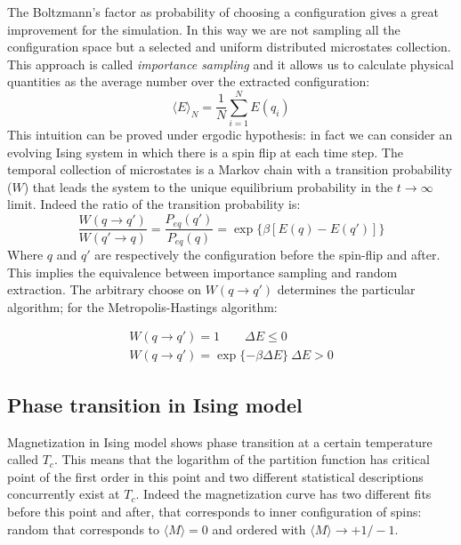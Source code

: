 \documentclass[11pt,a4paper]{article}
\begin{document}
\newpage
The Boltzmann's factor as probability of choosing a configuration gives a great improvement for the simulation. In this way we are not sampling all the configuration space but a selected and uniform distributed microstates collection. This approach is called \textit{importance sampling} and it allows us to calculate physical quantities as the average number over the extracted configuration:
\begin{equation}
  \langle E \rangle_N = \dfrac{1}{N} \sum_{i=1}^{N}{E(q_i)}
\end{equation} This intuition can be proved under ergodic hypothesis: in fact we can consider an evolving Ising system in which there is a spin flip at each time step. The temporal collection of microstates is a Markov chain with a transition probability ($W$) that leads the system to the unique equilibrium probability in the $t \rightarrow \infty$ limit. Indeed the ratio of the transition probability is:
$$ \dfrac{W(q \rightarrow q')}{W(q' \rightarrow q)} = \dfrac{P_{eq}(q')}{P_{eq}(q)}= \exp \lbrace \beta [E(q) - E(q')] \rbrace $$
Where $q$ and $q'$ are respectively the configuration before the spin-flip and after. This implies the equivalence between importance sampling and random extraction. The arbitrary choose on $W(q \rightarrow q')$ determines the particular algorithm; for the Metropolis-Hastings algorithm:

\begin{eqnarray}
  W(q \rightarrow q')=1 \qquad \Delta E \leq 0 \\
  W(q \rightarrow q')=\exp \lbrace -\beta \Delta E  \rbrace  \: \Delta E > 0
\end{eqnarray}

\bigskip

\subsection*{Phase transition in Ising model}
Magnetization in Ising model shows phase transition at a certain temperature called $T_c$. This means that the logarithm of the partition function has critical point of the first order in this point and two different statistical descriptions concurrently exist at $T_c$. Indeed the magnetization curve has two different fits before this point and after, that corresponds to inner configuration of spins: random that corresponds to $\langle M \rangle = 0$ and ordered with $\langle M \rangle \rightarrow +1 / -1$.
\end{document}

